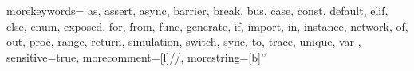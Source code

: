 {
  morekeywords={
    as,
    assert,
    async,
    barrier,
    break,
    bus,
    case,
    const,
    default,
    elif,
    else,
    enum,
    exposed,
    for,
    from,
    func,
    generate,
    if,
    import,
    in,
    instance,
    network,
    of,
    out,
    proc,
    range,
    return,
    simulation,
    switch,
    sync,
    to,
    trace,
    unique,
    var
  },
  sensitive=true,
  morecomment=[l]{//},
  morestring=[b]''
}